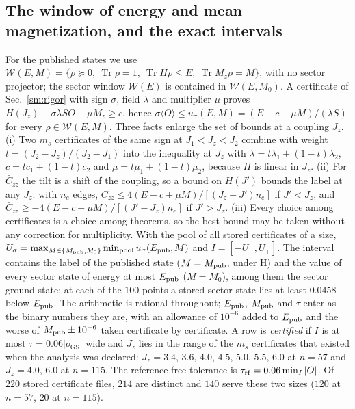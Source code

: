 \documentclass[aps,prx,onecolumn,10pt,nofootinbib,longbibliography,floatfix]{revtex4-2}
\theoremstyle{remark}
\newcommand{\Jz}{J_z}
\newcommand{\ms}{m_s}
\newcommand{\Czz}{\bar C_{zz}}
\newcommand{\W}{\mathcal{W}}
\newcommand{\Tr}{\operatorname{Tr}}
\newcommand{\GS}{\mathrm{GS}}
\begin{document}
\subsection{The window of energy and mean magnetization, and the exact intervals}
\label{sm:public_exact}
For the published states we use $\W(E,M)=\{\rho\succeq0,\ \Tr\rho=1,\ \Tr H\rho\le E,\ \Tr M_z\rho=M\}$, with no sector
projector; the sector window $\W(E)$ is contained in $\W(E,M_0)$. A certificate of Sec.~\ref{sm:rigor} with sign
$\sigma$, field $\lambda$ and multiplier $\mu$ proves $H(\Jz)-\sigma\lambda SO+\mu M_z\ge c$, hence
$\sigma\langle O\rangle\le u_\sigma(E,M)=(E-c+\mu M)/(\lambda S)$ for every $\rho\in\W(E,M)$. Three facts enlarge the
set of bounds at a coupling $\Jz$. (i) Two $\ms$ certificates of the same sign at $J_1<\Jz<J_2$ combine with weight
$t=(J_2-\Jz)/(J_2-J_1)$ into the inequality at $\Jz$ with $\lambda=t\lambda_1+(1-t)\lambda_2$, $c=tc_1+(1-t)c_2$ and
$\mu=t\mu_1+(1-t)\mu_2$, because $H$ is linear in $\Jz$. (ii) For $\Czz$ the tilt is a shift of the coupling, so a
bound on $H(J')$ bounds the label at any $\Jz$: with $n_e$ edges, $\Czz\le4(E-c+\mu M)/[(\Jz-J')n_e]$ if $J'<\Jz$, and
$\Czz\ge-4(E-c+\mu M)/[(J'-\Jz)n_e]$ if $J'>\Jz$. (iii) Every choice among certificates is a choice among theorems,
so the best bound may be taken without any correction for multiplicity. With the pool of all stored certificates of
a size, $U_\sigma=\max_{M\in\{M_{\rm pub},M_0\}}\min_{\rm pool}u_\sigma(E_{\rm pub},M)$ and $I=[-U_-,U_+]$. The
interval contains the label of the published state ($M=M_{\rm pub}$, under H) and the value of every sector state
of energy at most $E_{\rm pub}$ ($M=M_0$), among them the sector ground state: at each of the $100$ points a stored %
sector state lies at least $0.0458$ below $E_{\rm pub}$. The arithmetic is rational throughout; $E_{\rm pub}$, %
$M_{\rm pub}$ and $\tau$ enter as the binary numbers they are, with an allowance of $10^{-6}$ added to $E_{\rm pub}$ and %
the worse of $M_{\rm pub}\pm10^{-6}$ taken certificate by certificate. A row is \emph{certified} if $I$ is at most %
$\tau=0.06|o_\GS|$ wide and $\Jz$ lies in the range of the $\ms$ certificates that existed when the analysis was %
declared: $\Jz=3.4$, $3.6$, $4.0$, $4.5$, $5.0$, $5.5$, $6.0$ at $n=57$ and $\Jz=4.0$, $6.0$ at $n=115$. The %
reference-free tolerance is $\tau_{\rm rf}=0.06\min_I|O|$. Of $220$ stored certificate files, $214$ are distinct and %
$140$ serve these two sizes ($120$ at $n=57$, $20$ at $n=115$). %
\end{document}

